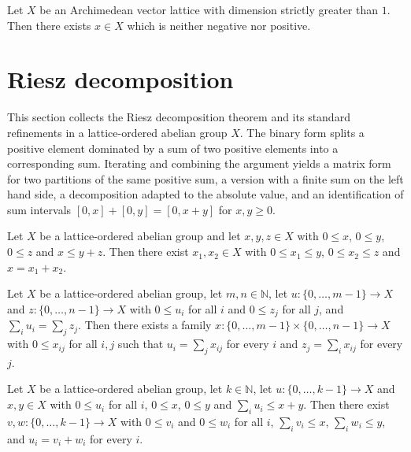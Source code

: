 \begin{theorem}
\label{thm:exists-not-nonneg-not-nonpos}
\leanok
{}
Let $X$ be an Archimedean vector lattice with dimension
strictly greater than $1$. Then there exists $x \in X$ which is neither
negative nor positive.
\end{theorem}

\section{Riesz decomposition}

This section collects the Riesz decomposition theorem and its standard
refinements in a lattice-ordered abelian group $X$. The binary form
splits a positive element dominated by a sum of two positive elements
into a corresponding sum. Iterating and combining the argument yields a
matrix form for two partitions of the same positive sum, a version with
a finite sum on the left hand side, a decomposition adapted to the
absolute value, and an identification of sum intervals
$[0, x] + [0, y] = [0, x + y]$ for $x, y \ge 0$.

\begin{theorem}
\label{thm:riesz-decomposition}
\leanok
Let $X$ be a lattice-ordered abelian group and let $x, y, z \in X$ with
$0 \le x$, $0 \le y$, $0 \le z$ and $x \le y + z$. Then there exist
$x_1, x_2 \in X$ with $0 \le x_1 \le y$, $0 \le x_2 \le z$ and
$x = x_1 + x_2$.
\end{theorem}

\begin{theorem}
\label{thm:riesz-decomposition-matrix}
\leanok
{}
Let $X$ be a lattice-ordered abelian group, let $m, n \in \mathbb{N}$,
let $u : \{0, \dots, m-1\} \to X$ and $z : \{0, \dots, n-1\} \to X$
with $0 \le u_i$ for all $i$ and $0 \le z_j$ for all $j$, and
$\sum_i u_i = \sum_j z_j$. Then there exists a family
$x : \{0, \dots, m-1\} \times \{0, \dots, n-1\} \to X$ with $0 \le x_{ij}$
for all $i, j$ such that $u_i = \sum_j x_{ij}$ for every $i$ and
$z_j = \sum_i x_{ij}$ for every $j$.
\end{theorem}

\begin{theorem}
\label{thm:riesz-decomposition-sum-le}
\leanok
{}
Let $X$ be a lattice-ordered abelian group, let $k \in \mathbb{N}$, let
$u : \{0, \dots, k-1\} \to X$ and $x, y \in X$ with $0 \le u_i$ for all
$i$, $0 \le x$, $0 \le y$ and $\sum_i u_i \le x + y$. Then there exist
$v, w : \{0, \dots, k-1\} \to X$ with $0 \le v_i$ and $0 \le w_i$ for
all $i$, $\sum_i v_i \le x$, $\sum_i w_i \le y$, and $u_i = v_i + w_i$
for every $i$.
\end{theorem}

